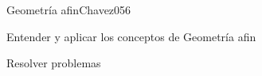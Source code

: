 \begin{sumilla}
\begin{unit}{Geometr\'ia afin}{Chavez05}{6}
   \begin{objetivos}
         \item  Entender y aplicar los conceptos de Geometr\'ia afin
         \item  Resolver problemas
   \end{objetivos}
\end{unit}

\begin{bibliografia}
\end{bibliografia}

\end{sumilla}


